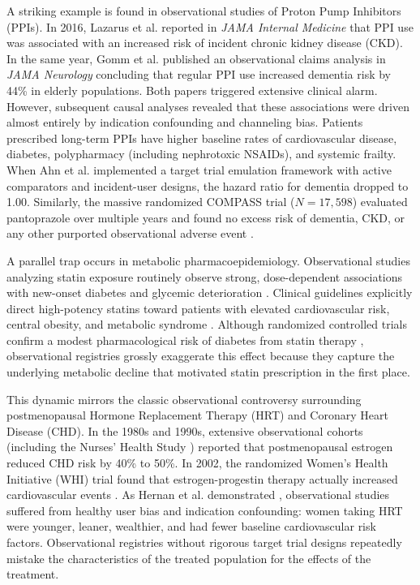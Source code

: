 \documentclass[10pt,letterpaper]{article}
\begin{document}
A striking example is found in observational studies of Proton Pump Inhibitors (PPIs). In 2016, Lazarus et al. \cite{lazarus2016} reported in \textit{JAMA Internal Medicine} that PPI use was associated with an increased risk of incident chronic kidney disease (CKD). In the same year, Gomm et al. \cite{gomm2016} published an observational claims analysis in \textit{JAMA Neurology} concluding that regular PPI use increased dementia risk by 44\% in elderly populations. Both papers triggered extensive clinical alarm. However, subsequent causal analyses revealed that these associations were driven almost entirely by indication confounding and channeling bias. Patients prescribed long-term PPIs have higher baseline rates of cardiovascular disease, diabetes, polypharmacy (including nephrotoxic NSAIDs), and systemic frailty. When Ahn et al. \cite{ahn2022} implemented a target trial emulation framework with active comparators and incident-user designs, the hazard ratio for dementia dropped to 1.00. Similarly, the massive randomized COMPASS trial ($N = 17,598$) evaluated pantoprazole over multiple years and found no excess risk of dementia, CKD, or any other purported observational adverse event \cite{moayyedi2019}. 

A parallel trap occurs in metabolic pharmacoepidemiology. Observational studies analyzing statin exposure routinely observe strong, dose-dependent associations with new-onset diabetes and glycemic deterioration \cite{corrao2014}. Clinical guidelines explicitly direct high-potency statins toward patients with elevated cardiovascular risk, central obesity, and metabolic syndrome \cite{ada2024}. Although randomized controlled trials confirm a modest pharmacological risk of diabetes from statin therapy \cite{sattar2010}, observational registries grossly exaggerate this effect because they capture the underlying metabolic decline that motivated statin prescription in the first place. 

This dynamic mirrors the classic observational controversy surrounding postmenopausal Hormone Replacement Therapy (HRT) and Coronary Heart Disease (CHD). In the 1980s and 1990s, extensive observational cohorts (including the Nurses' Health Study \cite{stampfer1991}) reported that postmenopausal estrogen reduced CHD risk by 40\% to 50\%. In 2002, the randomized Women's Health Initiative (WHI) trial found that estrogen-progestin therapy actually increased cardiovascular events \cite{rossouw2002}. As Hernan et al. demonstrated \cite{hernan2008}, observational studies suffered from healthy user bias and indication confounding: women taking HRT were younger, leaner, wealthier, and had fewer baseline cardiovascular risk factors. Observational registries without rigorous target trial designs repeatedly mistake the characteristics of the treated population for the effects of the treatment.
\end{document}
